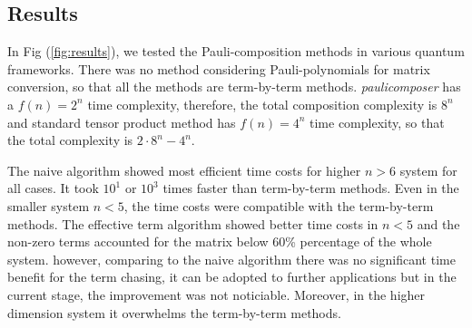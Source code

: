\documentclass[twocolumn]{article}
\begin{document}
\subsection{Results}

In Fig (\ref{fig:results}), we tested the Pauli-composition methods in various quantum frameworks.
There was no method considering Pauli-polynomials for matrix conversion, so that all the methods are 
term-by-term methods.
\textit{paulicomposer} has a $f(n) = 2^n$ time complexity, therefore, the total composition complexity is 
$8^n$ and standard tensor product method has $f(n) = 4^n$ time complexity, so that the total complexity is 
$2 \cdot 8^n - 4^n$.

The naive algorithm showed most efficient time costs for higher $n>6$ system for all cases.
It took $10^{1}$ or $10^{3}$ times faster than term-by-term methods. 
Even in the smaller system $n<5$, the time costs were compatible with the term-by-term methods.
The effective term algorithm showed better time costs in $n<5$ and the non-zero terms accounted for
the matrix below 60\% percentage of the whole system. 
however, comparing to the naive algorithm there was no significant time benefit for the 
term chasing, it can be adopted to further applications but in the current stage, 
the improvement was not noticiable. Moreover, in the higher dimension system 
it overwhelms the term-by-term methods.
\end{document}
